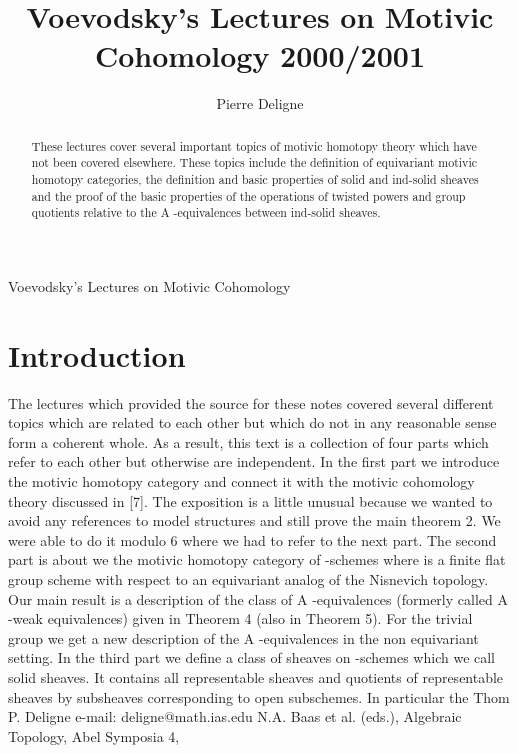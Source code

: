 \documentclass[11pt,a4paper]{article}
\theoremstyle{plain}
\theoremstyle{definition}
\begin{document}
\title{Voevodsky's Lectures on Motivic Cohomology 2000/2001}
\author{Pierre Deligne}
\date{}
\maketitle

Voevodsky's Lectures on Motivic Cohomology

\begin{abstract}
These lectures cover several important topics of motivic homotopy theory which have not been covered elsewhere. These topics include the definition
of equivariant motivic homotopy categories, the definition and basic properties of
solid and ind-solid sheaves and the proof of the basic properties of the operations of twisted powers and group quotients relative to the A -equivalences between
ind-solid sheaves.
\end{abstract}

\section{Introduction}

The lectures which provided the source for these notes covered several different
topics which are related to each other but which do not in any reasonable sense
form a coherent whole. As a result, this text is a collection of four parts which refer
to each other but otherwise are independent.
In the first part we introduce the motivic homotopy category and connect it with
the motivic cohomology theory discussed in [7]. The exposition is a little unusual
because we wanted to avoid any references to model structures and still prove the
main theorem 2. We were able to do it modulo 6 where we had to refer to the
next part.
The second part is about we the motivic homotopy category of -schemes where
is a finite flat group scheme with respect to an equivariant analog of the Nisnevich
topology. Our main result is a description of the class of A -equivalences (formerly
called A -weak equivalences) given in Theorem 4 (also in Theorem 5). For the trivial group we get a new description of the A -equivalences in the non equivariant
setting.
In the third part we define a class of sheaves on -schemes which we call
solid sheaves. It contains all representable sheaves and quotients of representable
sheaves by subsheaves corresponding to open subschemes. In particular the Thom
P. Deligne
e-mail: deligne@math.ias.edu
N.A. Baas et al. (eds.), Algebraic Topology, Abel Symposia 4,
\end{document}
